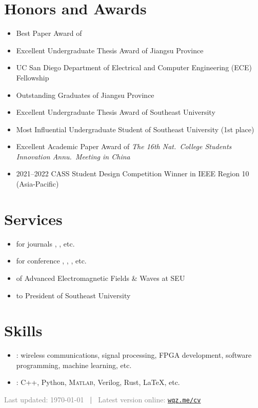 \documentclass{color-cv}
\begin{document}
\section{Honors and Awards}
\begin{itemize}
  \item Best Paper Award of 
  \item Excellent Undergraduate Thesis Award of Jiangsu Province
  \item UC San Diego Department of Electrical and Computer Engineering (ECE) Fellowship
  \item Outstanding Graduates of Jiangsu Province
  \item Excellent Undergraduate Thesis Award of Southeast University
  \item Most Influential Undergraduate Student of Southeast University (1st place)
  \item Excellent Academic Paper Award of \textit{The 16th Nat.\ College Students Innovation Annu.\ Meeting in China}
  \item 2021--2022 CASS Student Design Competition Winner in IEEE Region 10 (Asia-Pacific)
\end{itemize}

\section{Services}
\begin{itemize}
  \item {} for journals , , etc.
  \item {} for conference , , , etc.
  \item {} of Advanced Electromagnetic Fields \& Waves at SEU
  \item {} to President of Southeast University
\end{itemize}

\section{Skills}
\begin{itemize}
  \item {}: wireless communications, signal processing, FPGA development, software programming, machine learning, etc.
  \item {}: C++, Python, \textsc{Matlab}, Verilog, Rust, \LaTeX{}, etc.
\end{itemize}

\vfill\noindent\centering\textcolor{gray}
  {\small Last updated: \today{} ~\textbf{|}~ Latest version online: \href{https://wqz.me/cv}{\color{gray}\texttt{wqz.me/cv}}}
\end{document}
